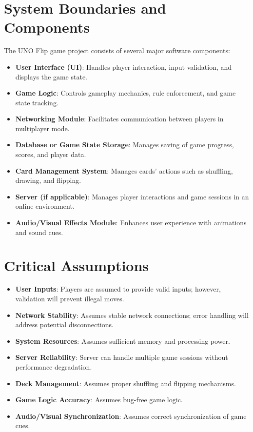 \documentclass{article}
\begin{document}
\section{System Boundaries and Components}
The UNO Flip game project consists of several major software components:
\begin{itemize}
    \item \textbf{User Interface (UI)}: Handles player interaction, input validation, and displays the game state.
    \item \textbf{Game Logic}: Controls gameplay mechanics, rule enforcement, and game state tracking.
    \item \textbf{Networking Module}: Facilitates communication between players in multiplayer mode.
    \item \textbf{Database or Game State Storage}: Manages saving of game progress, scores, and player data.
    \item \textbf{Card Management System}: Manages cards' actions such as shuffling, drawing, and flipping.
    \item \textbf{Server (if applicable)}: Manages player interactions and game sessions in an online environment.
    \item \textbf{Audio/Visual Effects Module}: Enhances user experience with animations and sound cues.
\end{itemize}

\section{Critical Assumptions}
\begin{itemize}
    \item \textbf{User Inputs}: Players are assumed to provide valid inputs; however, validation will prevent illegal moves.
    \item \textbf{Network Stability}: Assumes stable network connections; error handling will address potential disconnections.
    \item \textbf{System Resources}: Assumes sufficient memory and processing power.
    \item \textbf{Server Reliability}: Server can handle multiple game sessions without performance degradation.
    \item \textbf{Deck Management}: Assumes proper shuffling and flipping mechanisms.
    \item \textbf{Game Logic Accuracy}: Assumes bug-free game logic.
    \item \textbf{Audio/Visual Synchronization}: Assumes correct synchronization of game cues.
\end{itemize}
\end{document}

